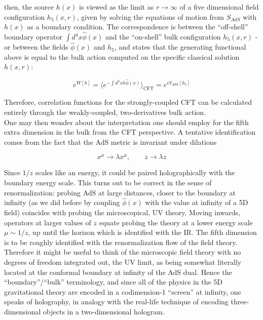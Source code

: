 then, the source $h(x)$ is viewed as the limit as $r \rightarrow \infty$ of a five dimensional field configuration $h_5(x,r)$, given by solving the equations of motion from $S_{AdS}$ with $h(x)$ as a boundary condition. The correspondence is between the ``off-shell'' boundary operator $\int d^4 x \hat \phi(x)$ and the ``on-shell'' bulk configuration $h_5(x,r)$ - or between the fields $\hat \phi(x)$ and $h_5$, and states that the generating functional above is equal to the bulk action computed on the specific classical solution $h(x,r)$:

\begin{equation}
	e^{W[h]} = \langle e^{-\int d^4 x h \hat \phi(x)} \rangle_\text{CFT} = e^{iS_{AdS}[h_5]}
	\label{}
\end{equation}

Therefore, correlation functions for the strongly-coupled CFT can be calculated entirely through the weakly-coupled, two-derivatives bulk action.\\

One may then wonder about the interpretation one should employ for the fifth extra dimension in the bulk from the CFT perspective. A tentative identification comes from the fact that the AdS metric is invariant under dilations

\begin{equation}
	x^\mu \rightarrow \lambda x^\mu, \quad \quad z \rightarrow \lambda z
	\label{}
\end{equation}

Since $1/z$ scales like an energy, it could be paired holographically with the boundary energy scale. This turns out to be correct in the sense of renormalization: probing AdS at large distances, closer to the boundary at infinity (as we did before by coupling $\hat\phi(x)$ with the value at infinity of a 5D field) coincides with probing the microscopical, UV theory. Moving inwards, operators at larger values of $z$ equate probing the theory at a lower energy scale $\mu \sim 1/z$, up until the horizon which is identified with the IR. The fifth dimension is to be roughly identified with the renormalization flow of the field theory.\\

Therefore it might be useful to think of the microscopic field theory with no degrees of freedom integrated out, the UV limit, as being somewhat literally located at the conformal boundary at infinity of the AdS dual. Hence the ``boundary''/``bulk'' terminology, and since all of the physics in the 5D gravitational theory are encoded in a codimension-1 ``screen'' at infinity, one speaks of holography, in analogy with the real-life technique of encoding three-dimensional objects in a two-dimensional hologram.\\

